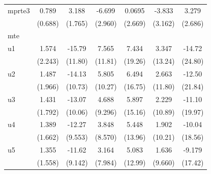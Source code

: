 \begin{table}[htbp]
\begin{tabular}{l*{6}{c}}
\addlinespace
mprte3              &       0.789         &       3.188\sym{*}  &      -6.699\sym{**} &      0.0695         &      -3.833         &       3.279         \\
                    &     (0.688)         &     (1.765)         &     (2.960)         &     (2.669)         &     (3.162)         &     (2.686)         \\
\midrule
mte                 &                     &                     &                     &                     &                     &                     \\
u1                  &       1.574         &      -15.79         &       7.565         &       7.434         &       3.347         &      -14.72         \\
                    &     (2.243)         &     (11.80)         &     (11.81)         &     (19.26)         &     (13.24)         &     (24.80)         \\
\addlinespace
u2                  &       1.487         &      -14.13         &       5.805         &       6.494         &       2.663         &      -12.50         \\
                    &     (1.966)         &     (10.73)         &     (10.27)         &     (16.75)         &     (11.80)         &     (21.84)         \\
\addlinespace
u3                  &       1.431         &      -13.07         &       4.688         &       5.897         &       2.229         &      -11.10         \\
                    &     (1.792)         &     (10.06)         &     (9.296)         &     (15.16)         &     (10.89)         &     (19.97)         \\
\addlinespace
u4                  &       1.389         &      -12.27         &       3.848         &       5.448         &       1.902         &      -10.04         \\
                    &     (1.662)         &     (9.553)         &     (8.570)         &     (13.96)         &     (10.21)         &     (18.56)         \\
\addlinespace
u5                  &       1.355         &      -11.62         &       3.164         &       5.083         &       1.636         &      -9.179         \\
                    &     (1.558)         &     (9.142)         &     (7.984)         &     (12.99)         &     (9.660)         &     (17.42)         \\

\end{tabular}
\end{table}
